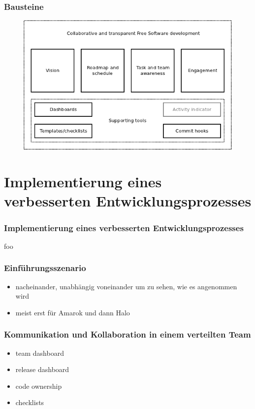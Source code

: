 \documentclass{beamer}
\begin{document}
\begin{frame}
\frametitle{Bausteine}
\begin{figure}[h]
 \centering
 \includegraphics[scale=0.5,keepaspectratio=true]{./buildingblocks.png}
\end{figure}
\end{frame}

\section{Implementierung eines verbesserten Entwicklungsprozesses}

\begin{frame}
\frametitle{Implementierung eines verbesserten Entwicklungsprozesses}
foo
\end{frame}

\begin{frame}
\frametitle{Einf\"uhrungsszenario}
\begin{itemize}
 \item nacheinander, unabh\"angig voneinander um zu sehen, wie es angenommen wird
 \item meist erst f\"ur Amarok und dann Halo
\end{itemize}
\end{frame}

\begin{frame}
\frametitle{Kommunikation und Kollaboration in einem verteilten Team}
\begin{itemize}
 \item team dashboard
 \item release dashboard
 \item code ownership
 \item checklists
\end{itemize}
\end{frame}
\end{document}
